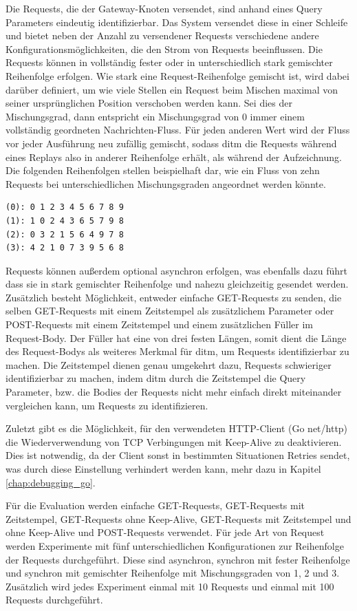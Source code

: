 \documentclass[12pt,a4paper]{report}
\begin{document}
Die Requests, die der Gateway-Knoten versendet, sind anhand eines Query Parameters eindeutig identifizierbar. Das System versendet
diese in einer Schleife und bietet neben der Anzahl zu versendener Requests verschiedene andere Konfigurationsmöglichkeiten, die
den Strom von Requests beeinflussen. Die Requests können in vollständig fester oder in unterschiedlich stark gemischter
Reihenfolge erfolgen. Wie stark eine Request-Reihenfolge gemischt ist, wird dabei darüber definiert, um wie viele Stellen ein
Request beim Mischen maximal von seiner ursprünglichen Position verschoben werden kann. Sei dies der Mischungsgrad, dann
entspricht ein Mischungsgrad von 0 immer einem vollständig geordneten Nachrichten-Fluss. Für jeden anderen Wert wird der Fluss vor
jeder Ausführung neu zufällig gemischt, sodass ditm die Requests während eines Replays also in anderer Reihenfolge erhält, als
während der Aufzeichnung. Die folgenden Reihenfolgen stellen beispielhaft dar, wie ein Fluss von zehn Requests bei
unterschiedlichen Mischungsgraden angeordnet werden könnte.
\begin{verbatim}
(0): 0 1 2 3 4 5 6 7 8 9
(1): 1 0 2 4 3 6 5 7 9 8
(2): 0 3 2 1 5 6 4 9 7 8
(3): 4 2 1 0 7 3 9 5 6 8
\end{verbatim}
Requests können außerdem optional asynchron erfolgen, was ebenfalls dazu führt dass sie in stark gemischter Reihenfolge und nahezu
gleichzeitig gesendet werden. Zusätzlich besteht Möglichkeit, entweder einfache GET-Requests zu senden, die selben GET-Requests
mit einem Zeitstempel als zusätzlichem Parameter oder POST-Requests mit einem Zeitstempel und einem zusätzlichen Füller im
Request-Body. Der Füller hat eine von drei festen Längen, somit dient die Länge des Request-Bodys als weiteres Merkmal für ditm,
um Requests identifizierbar zu machen. Die Zeitstempel dienen genau umgekehrt dazu, Requests schwieriger identifizierbar zu
machen, indem ditm durch die Zeitstempel die Query Parameter, bzw. die Bodies der Requests nicht mehr einfach direkt miteinander
vergleichen kann, um Requests zu identifizieren.

Zuletzt gibt es die Möglichkeit, für den verwendeten HTTP-Client (Go net/http) die Wiederverwendung von TCP Verbingungen mit Keep-Alive
zu deaktivieren. Dies ist notwendig, da der Client sonst in bestimmten Situationen Retries sendet, was durch diese Einstellung
verhindert werden kann, mehr dazu in Kapitel \ref{chap:debugging_go}.

Für die Evaluation werden einfache GET-Requests, GET-Requests mit Zeitstempel, GET-Requests ohne Keep-Alive, GET-Requests mit
Zeitstempel und ohne Keep-Alive und POST-Requests verwendet. Für jede Art von Request werden Experimente mit fünf
unterschiedlichen Konfigurationen zur Reihenfolge der Requests durchgeführt. Diese sind asynchron, synchron mit fester Reihenfolge
und synchron mit gemischter Reihenfolge mit Mischungsgraden von 1, 2 und 3. Zusätzlich wird jedes Experiment einmal mit 10
Requests und einmal mit 100 Requests durchgeführt.
\end{document}
